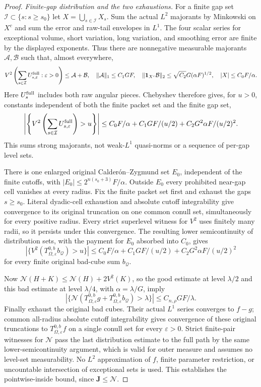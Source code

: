 \documentclass[11pt]{article}
\numberwithin{equation}{section}
\theoremstyle{remark}
\theoremstyle{definition}
\newcommand{\NN}{\mathcal N}
\begin{document}
\begin{proof}
\emph{Finite-gap distribution and the two exhaustions.}
For a finite gap set $\mathcal I\subset\{s:s\ge s_0\}$ let
$X=\bigcup_{s\in\mathcal I}X_s$.  Sum the actual $L^2$ majorants by
Minkowski on $X^c$ and sum the error and raw-tail envelopes in $L^1$.
The four scalar series for exceptional volume, short variation, long
variation, and smoothing error are finite by the displayed exponents.
Thus there are nonnegative measurable majorants $\mathcal A,\mathcal B$
such that, almost everywhere,
\[
 V^2\left(\sum_{s\in\mathcal I}U_{s,\varepsilon}^{\rm full}:
              \varepsilon>0\right)\le\mathcal A+\mathcal B,
 \quad
 \|\mathcal A\|_1\le C_1GF,\quad
 \|\mathbf1_{X^c}\mathcal B\|_2\le\sqrt{C_2}G(\alpha F)^{1/2},
 \quad |X|\le C_0F/\alpha.
\]
Here $U_s^{\rm full}$ includes both raw angular pieces.  Chebyshev
therefore gives, for $u>0$, constants independent of both the finite
packet set and the finite gap set,
\[
 \left|\left\{V^2\left(\sum_{s\in\mathcal I}
        U_{s,\varepsilon}^{\rm full}\right)>u\right\}\right|
 \le C_0F/\alpha+C_1GF/(u/2)+C_2G^2\alpha F/(u/2)^2.
\]
This sums strong majorants, not weak-$L^1$ quasi-norms or a sequence of
per-gap level sets.

There is one enlarged original Calder\'on--Zygmund set $E_0$, independent
of the finite cutoffs, with
$|E_0|\le2^{n(s_0+3)}F/\alpha$.  Outside $E_0$ every prohibited
near-gap cell vanishes at every radius.  Fix the finite packet set
first and exhaust the gaps $s\ge s_0$.  Literal dyadic-cell exhaustion
and absolute cutoff integrability give convergence to its original
truncation on one common conull set, simultaneously for every positive
radius.  Every strict superlevel witness for $V^2$ uses finitely many
radii, so it persists under this convergence.  The resulting lower
semicontinuity of distribution sets, with the payment
for $E_0$ absorbed into $C_0$, gives
\[
 |\{V^2(T^{0,b}_{\Omega,\varepsilon}b_{\mathcal Q})>u\}|
 \le C_0F/\alpha+C_1GF/(u/2)+C_2G^2\alpha F/(u/2)^2
\]
for every finite original bad-cube sum $b_{\mathcal Q}$.

Now $\NN(H+K)\le\NN(H)+2V^2(K)$, so the good estimate at level
$\lambda/2$ and this bad estimate at level $\lambda/4$, with
$\alpha=\lambda/G$, imply
\[
 |\{\NN(T^{0,b}_{\Omega,\varepsilon}g+
              T^{0,b}_{\Omega,\varepsilon}b_{\mathcal Q})>\lambda\}|
 \le C_{n,\rho}GF/\lambda.
\]
Finally exhaust the original bad cubes.  Their actual $L^1$ series
converges to $f-g$; common all-radius absolute cutoff integrability
gives convergence of these original truncations to
$T^{0,b}_{\Omega,\varepsilon}f$ on a single conull set for every
$\varepsilon>0$.  Strict finite-pair witnesses for $\NN$ pass the last distribution
estimate to the full path by the same lower-semicontinuity argument,
which is valid for outer measure and assumes no level-set measurability.  No $L^2$
approximation of $f$, finite parameter restriction, or uncountable
intersection of exceptional sets is used.  This establishes the
pointwise-inside bound, since $\mathbf J\le\NN$.


\end{proof}
\end{document}
